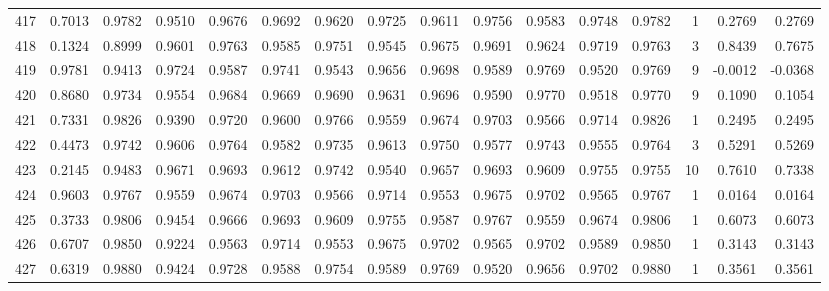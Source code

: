 \begin{tabular}{lrrrrrrrrrrrrrrr}
417 &      0.7013 &  0.9782 &  0.9510 &  0.9676 &  0.9692 &  0.9620 &  0.9725 &  0.9611 &  0.9756 &  0.9583 &   0.9748 &     0.9782 &      1 &                    0.2769 &                     0.2769 \\
418 &      0.1324 &  0.8999 &  0.9601 &  0.9763 &  0.9585 &  0.9751 &  0.9545 &  0.9675 &  0.9691 &  0.9624 &   0.9719 &     0.9763 &      3 &                    0.8439 &                     0.7675 \\
419 &      0.9781 &  0.9413 &  0.9724 &  0.9587 &  0.9741 &  0.9543 &  0.9656 &  0.9698 &  0.9589 &  0.9769 &   0.9520 &     0.9769 &      9 &                   -0.0012 &                    -0.0368 \\
420 &      0.8680 &  0.9734 &  0.9554 &  0.9684 &  0.9669 &  0.9690 &  0.9631 &  0.9696 &  0.9590 &  0.9770 &   0.9518 &     0.9770 &      9 &                    0.1090 &                     0.1054 \\
421 &      0.7331 &  0.9826 &  0.9390 &  0.9720 &  0.9600 &  0.9766 &  0.9559 &  0.9674 &  0.9703 &  0.9566 &   0.9714 &     0.9826 &      1 &                    0.2495 &                     0.2495 \\
422 &      0.4473 &  0.9742 &  0.9606 &  0.9764 &  0.9582 &  0.9735 &  0.9613 &  0.9750 &  0.9577 &  0.9743 &   0.9555 &     0.9764 &      3 &                    0.5291 &                     0.5269 \\
423 &      0.2145 &  0.9483 &  0.9671 &  0.9693 &  0.9612 &  0.9742 &  0.9540 &  0.9657 &  0.9693 &  0.9609 &   0.9755 &     0.9755 &     10 &                    0.7610 &                     0.7338 \\
424 &      0.9603 &  0.9767 &  0.9559 &  0.9674 &  0.9703 &  0.9566 &  0.9714 &  0.9553 &  0.9675 &  0.9702 &   0.9565 &     0.9767 &      1 &                    0.0164 &                     0.0164 \\
425 &      0.3733 &  0.9806 &  0.9454 &  0.9666 &  0.9693 &  0.9609 &  0.9755 &  0.9587 &  0.9767 &  0.9559 &   0.9674 &     0.9806 &      1 &                    0.6073 &                     0.6073 \\
426 &      0.6707 &  0.9850 &  0.9224 &  0.9563 &  0.9714 &  0.9553 &  0.9675 &  0.9702 &  0.9565 &  0.9702 &   0.9589 &     0.9850 &      1 &                    0.3143 &                     0.3143 \\
427 &      0.6319 &  0.9880 &  0.9424 &  0.9728 &  0.9588 &  0.9754 &  0.9589 &  0.9769 &  0.9520 &  0.9656 &   0.9702 &     0.9880 &      1 &                    0.3561 &                     0.3561 \\

\end{tabular}
